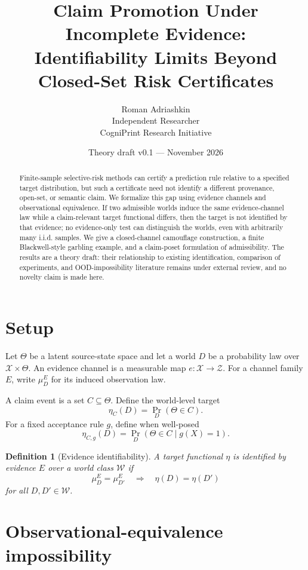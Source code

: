 \documentclass[11pt]{article}
\title{Claim Promotion Under Incomplete Evidence:\\
Identifiability Limits Beyond Closed-Set Risk Certificates}
\author{Roman Adriashkin\\Independent Researcher\\CogniPrint Research Initiative}
\date{Theory draft v0.1 --- November 2026}
\newtheorem{definition}{Definition}
\begin{document}
\maketitle

\begin{abstract}
Finite-sample selective-risk methods can certify a prediction rule relative to
a specified target distribution, but such a certificate need not identify a
different provenance, open-set, or semantic claim. We formalize this gap using
evidence channels and observational equivalence. If two admissible worlds
induce the same evidence-channel law while a claim-relevant target functional
differs, then the target is not identified by that evidence; no evidence-only
test can distinguish the worlds, even with arbitrarily many i.i.d. samples.
We give a closed-channel camouflage construction, a finite Blackwell-style
garbling example, and a claim-poset formulation of admissibility. The results
are a theory draft: their relationship to existing identification, comparison
of experiments, and OOD-impossibility literature remains under external
review, and no novelty claim is made here.
\end{abstract}

\section{Setup}

Let $\Theta$ be a latent source-state space and let a world $D$ be a
probability law over $\mathcal X\times\Theta$. An evidence channel is a
measurable map $e:\mathcal X\to\mathcal Z$. For a channel family $E$, write
$\mu_D^E$ for its induced observation law.

A claim event is a set $C\subseteq\Theta$. Define the world-level target
\[
\eta_C(D)=\Pr_D(\Theta\in C).
\]
For a fixed acceptance rule $g$, define when well-posed
\[
\eta_{C,g}(D)=\Pr_D(\Theta\in C\mid g(X)=1).
\]

\begin{definition}[Evidence identifiability]
A target functional $\eta$ is identified by evidence $E$ over a world class
$\mathcal W$ if
\[
\mu_D^E=\mu_{D'}^E
\quad\Longrightarrow\quad
\eta(D)=\eta(D')
\]
for all $D,D'\in\mathcal W$.
\end{definition}

\section{Observational-equivalence impossibility}
\end{document}
